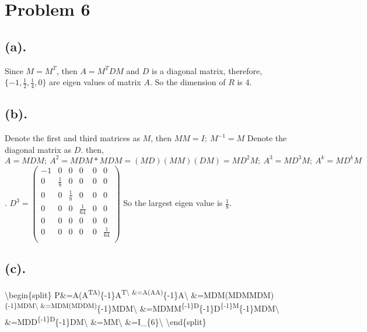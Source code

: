 \documentclass[11pt]{article}
\begin{document}
    \hypertarget{problem-6}{%
\section{Problem 6}\label{problem-6}}

    \hypertarget{a.}{%
\subsection{(a).}\label{a.}}

Since \(M=M^T\), then \(A=M^TDM\) and \(D\) is a diagonal matrix,
therefore, \(\{-1,\frac{1}{2},\frac{1}{4},0\}\) are eigen values of
matrix \(A\). So the dimension of \(R\) is 4.

    \hypertarget{b.}{%
\subsection{(b).}\label{b.}}

Denote the first and third matrices as \(M\), then \(MM=I;~M^{-1}=M\)
Denote the diagonal matrix as \(D\). then,
\(A=MDM;~A^2=MDM*MDM=(MD)(MM)(DM)=MD^2M;~A^3=MD^3M;~A^k=MD^kM\).
\(D^3=\left( \begin{matrix} -1&0&0&0&0&0\\ 0&\frac{1}{8}&0&0&0&0\\ 0&0&\frac{1}{8}&0&0&0\\ 0&0&0&\frac{1}{64}&0&0\\ 0&0&0&0&0&0\\ 0&0&0&0&0&\frac{1}{64}\\ \end{matrix} \right)\)
So the largest eigen value is \(\frac{1}{8}\).

    \hypertarget{c.}{%
\subsection{(c).}\label{c.}}

\textbackslash{}begin\{split\}
P\&=A(A\textsuperscript{TA)}\{-1\}A\textsuperscript{T\textbackslash{}
\&=A(AA)}\{-1\}A\textbackslash{}
\&=MDM(MDMMDM)\textsuperscript{\{-1\}MDM\textbackslash{}
\&=MDM(MDDM)}\{-1\}MDM\textbackslash{}
\&=MDMM\textsuperscript{\{-1\}D}\{-1\}D\textsuperscript{\{-1\}M}\{-1\}MDM\textbackslash{}
\&=MDD\textsuperscript{\{-1\}D}\{-1\}DM\textbackslash{}
\&=MM\textbackslash{} \&=I\_\{6\}\textbackslash{}
\textbackslash{}end\{split\}


    
    
    
    
\end{document}
